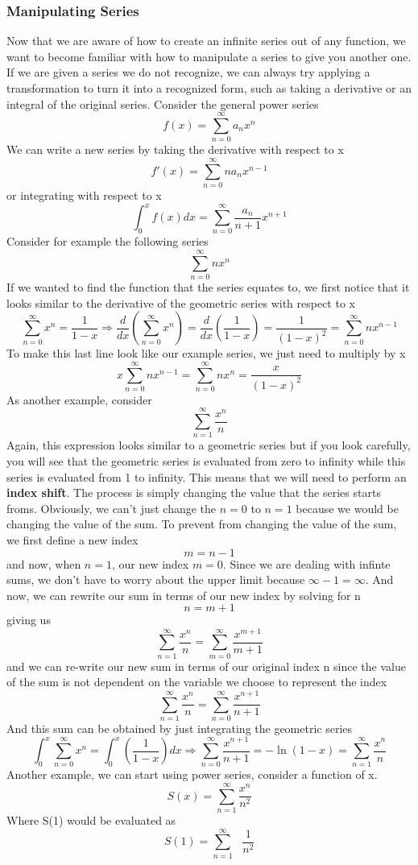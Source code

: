 \documentclass{article}
\newcommand{\be}{\begin{equation}}
\newcommand{\ee}{\end{equation}}
\newcommand{\sumzero}{\sum_{n=0}^\infty}
\newcommand{\sumone}{\sum_{n=1}^\infty}
\begin{document}
\subsubsection*{Manipulating Series}
Now that we are aware of how to create an infinite series out of any function, we want to become familiar with how to manipulate a series to give you another one.
If we are given a series we do not recognize, we can always try applying a transformation to turn it into a recognized form, such as taking a derivative or an integral of the original series.
Consider the general power series
\be
f(x) = \sumzero a_nx^n
\ee
We can write a new series by taking the derivative with respect to x
\be
f'(x) = \sumzero na_nx^{n-1}
\ee
or integrating with respect to x
\be
\int_{0}^{x} f(x) dx = \sumzero \frac{a_n}{n+1}x^{n+1}
\ee
Consider for example the following series
\be
\sumzero nx^n
\ee
If we wanted to find the function that the series equates to, we first notice that it looks similar to the derivative of the geometric series with respect to x
\be
	\sumzero x^n = \frac{1}{1-x} \Rightarrow \frac{d}{dx} \left( \sumzero x^n\right) = \frac{d}{dx} \left( \frac{1}{1-x} \right) = \frac{1}{(1-x)^2} = \sumzero nx^{n-1}
\ee
To make this last line look like our example series, we just need to multiply by x
\be
x \sumzero nx^{n-1} = \sumzero nx^{n} = \frac{x}{(1-x)^2}
\ee
As another example, consider
\be
\sumone \frac{x^n}{n}
\ee
Again, this expression looks similar to a geometric series but if you look carefully, you will see that the geometric series is evaluated from zero to infinity while this series is evaluated from 1 to infinity.
This means that we will need to perform an \textbf{index shift}.
The process is simply changing the value that the series starts froms.
Obviously, we can't just change the $n = 0$ to $n = 1$ because we would be changing the value of the sum.
To prevent from changing the value of the sum, we first define a new index
\be
m = n - 1
\ee
and now, when $n = 1$, our new index $m = 0$.
Since we are dealing with infinte sums, we don't have to worry about the upper limit because $\infty - 1 = \infty$.
And now, we can rewrite our sum in terms of our new index by solving for n
\be
n = m + 1
\ee
giving us
\be
\sumone \frac{x^n}{n} = \sum_{m = 0}^{\infty} \frac{x^{m + 1}}{m + 1}
\ee
and we can re-write our new sum in terms of our original index n since the value of the sum is not dependent on the variable we choose to represent the index
\be
\sumone \frac{x^n}{n} = \sum_{n = 0}^{\infty} \frac{x^{n + 1}}{n + 1}
\ee
And this sum can be obtained by just integrating the geometric series
\be
\int_{0}^{x} \sumzero x^n = \int_{0}^{x} \left( \frac{1}{1 - x} \right) dx \Rightarrow \sum_{n = 0}^{\infty} \frac{x^{n + 1}}{n + 1} =  - \ln(1 - x) = \sumone \frac{x^n}{n}
\ee
Another example, we can start using power series, consider a function of x.
\be
S(x) = \sum_{n=1}^\infty \frac{x^n}{n^2}
\ee
Where S(1) would be evaluated as
\be
S(1) = \sum_{n=1}^\infty \text{ }\frac{1}{n^2}
\ee
\end{document}
